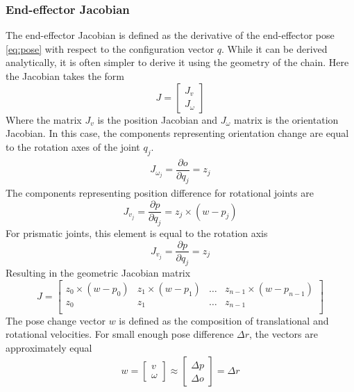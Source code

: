 \documentclass[times, utf8, diplomski, english]{fer}
\begin{document}
\subsubsection{End-effector Jacobian}
The end-effector Jacobian is defined as the derivative of the end-effector pose \ref{eq:pose} with respect to the configuration vector $q$.
While it can be derived analytically, it is often simpler to derive it using the geometry of the chain.
Here the Jacobian takes the form 
\begin{equation}
J =
\begin{bmatrix}
J_{v} \\ 
J_{\omega}
\end{bmatrix}
\label{jacob1}
\end{equation}
Where the matrix $J_v$ is the position Jacobian and $J_{\omega}$ matrix is the orientation Jacobian.
In this case, the components representing orientation change are equal to the rotation axes of the joint $q_j$.
\begin{align}
J_{\omega_j} = \dfrac{\partial o}{\partial q_j} = z_{j}
\end{align}
The components representing position difference for rotational joints are
\begin{equation}
J_{v_j} = \dfrac{\partial p}{ \partial q_{j}} = z_j \times (w - p_j)
\end{equation}
For prismatic joints, this element is equal to the rotation axis
\begin{equation}
J_{v_j} = \dfrac{\partial p}{ \partial q_j} = z_j
\end{equation}
Resulting in the geometric Jacobian matrix
\begin{equation}
J =
\begin{bmatrix}
z_{0} \times (w - p_{0}) &z_{1} \times (w - p_{1}) &\ldots &z_{n-1} \times (w - p_{n-1})\\
z_{0} &z_{1} &\ldots &z_{n-1}\\
\end{bmatrix}
\label{jacob2}
\end{equation}
The pose change vector $w$ is defined as the composition of translational and rotational velocities.
For small enough pose difference $\Delta r$, the vectors are approximately equal
\begin{align}\label{eq:pose_diff}
w  = 
\begin{bmatrix} 
v \\ \omega 
\end{bmatrix} 
\approx 
\begin{bmatrix}
\Delta p \\
\Delta o
\end{bmatrix}
= 
\Delta r
\end{align}
\end{document}
